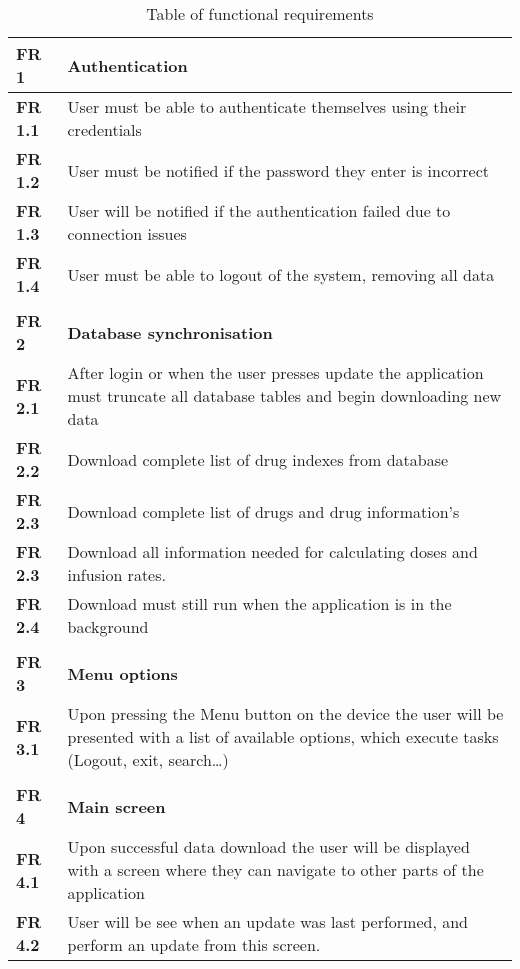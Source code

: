 \begin{center}
\begin{longtable}{| l | p{13cm} |}
\caption{Table of functional requirements}\tabularnewline
\hline
\textbf{FR 1}   & \textbf{Authentication}   \\ \hline
\textbf{FR 1.1} & User must be able to authenticate themselves using their credentials   \\ \hline
\textbf{FR 1.2} & User must be notified if the password they enter is incorrect\\ \hline
\textbf{FR 1.3} & User will be notified if the authentication failed due to connection issues \\ \hline
\textbf{FR 1.4} & User must be able to logout of the system, removing all data \\ \hline
\textbf{}  &  \\ \hline
\textbf{FR 2}   & \textbf{Database synchronisation}   \\ \hline
\textbf{FR 2.1} & After login or when the user presses update the application must truncate all database tables and begin downloading new data  \\ \hline
\textbf{FR 2.2} & Download complete list of drug indexes from database    \\ \hline
\textbf{FR 2.3} & Download complete list of drugs and drug information's  \\ \hline
\textbf{FR 2.3} & Download all information needed for calculating doses and infusion rates.   \\ \hline
\textbf{FR 2.4} & Download must still run when the application is in the background \\ \hline
\textbf{}  &  \\ \hline
\textbf{FR 3}   & \textbf{Menu options}\\ \hline
\textbf{FR 3.1} & Upon pressing the Menu button on the device the user will be presented with a list of available options, which execute tasks (Logout, exit, search…)   \\ \hline
\textbf{}  &  \\ \hline
\textbf{FR 4}   & \textbf{Main screen} \\ \hline
\textbf{FR 4.1} & Upon successful data download the user will be displayed with a screen where they can navigate to other parts of the application   \\ \hline
\textbf{FR 4.2} & User will be see when an update was last performed, and perform an update from this screen.\\ \hline

\end{longtable}
\end{center}
